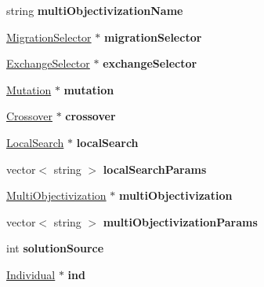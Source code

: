 \begin{DoxyCompactItemize}
string {\bfseries multi\+Objectivization\+Name}
\item 
\mbox{\label{structTAlgorithm_ae66c69b9f125acb363a8662abd15a709}} 
\mbox{\hyperlink{classMigrationSelector}{Migration\+Selector}} $\ast$ {\bfseries migration\+Selector}
\item 
\mbox{\label{structTAlgorithm_a4fac798faf055d9d78771e541c46a98a}} 
\mbox{\hyperlink{classExchangeSelector}{Exchange\+Selector}} $\ast$ {\bfseries exchange\+Selector}
\item 
\mbox{\label{structTAlgorithm_af30d430da8ec08152c4a5056b29eaed2}} 
\mbox{\hyperlink{classMutation}{Mutation}} $\ast$ {\bfseries mutation}
\item 
\mbox{\label{structTAlgorithm_a3f859a16df8b05dd210e89e2212285d1}} 
\mbox{\hyperlink{classCrossover}{Crossover}} $\ast$ {\bfseries crossover}
\item 
\mbox{\label{structTAlgorithm_aa3ceb63aec5a19d377c73f777ae23e47}} 
\mbox{\hyperlink{classLocalSearch}{Local\+Search}} $\ast$ {\bfseries local\+Search}
\item 
\mbox{\label{structTAlgorithm_ae61847fa5f79552ee797adf1386c5b4f}} 
vector$<$ string $>$ {\bfseries local\+Search\+Params}
\item 
\mbox{\label{structTAlgorithm_a08323c63e8b184fa41165f962e82de6a}} 
\mbox{\hyperlink{classMultiObjectivization}{Multi\+Objectivization}} $\ast$ {\bfseries multi\+Objectivization}
\item 
\mbox{\label{structTAlgorithm_a7f115a397ed8203dde37de6cc9c86777}} 
vector$<$ string $>$ {\bfseries multi\+Objectivization\+Params}
\item 
\mbox{\label{structTAlgorithm_a8a80833813e0e39a616ba16cb5165c14}} 
int {\bfseries solution\+Source}
\item 
\mbox{\label{structTAlgorithm_a7e65f546da96d6fe3d670cb508e8b540}} 
\mbox{\hyperlink{classIndividual}{Individual}} $\ast$ {\bfseries ind}
\item 

\end{DoxyCompactItemize}
